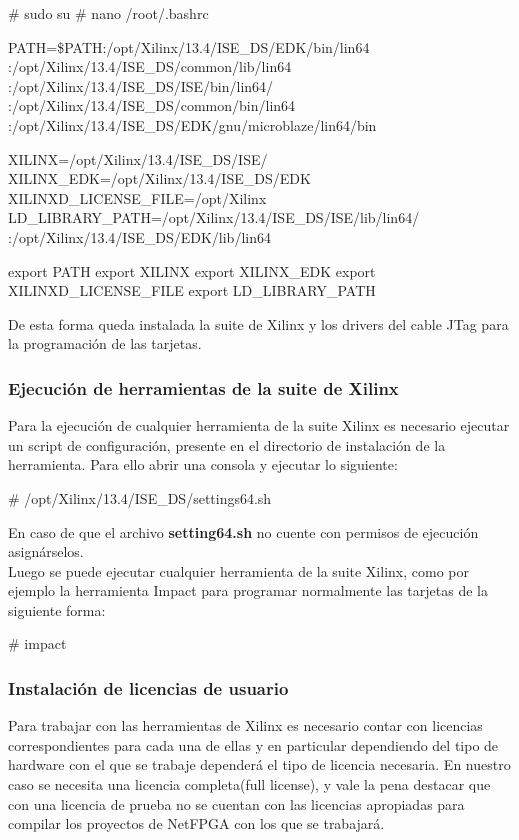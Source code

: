 \begin{bash}
# sudo su
# nano /root/.bashrc

PATH=\$PATH:/opt/Xilinx/13.4/ISE_DS/EDK/bin/lin64
:/opt/Xilinx/13.4/ISE_DS/common/lib/lin64
:/opt/Xilinx/13.4/ISE_DS/ISE/bin/lin64/
:/opt/Xilinx/13.4/ISE_DS/common/bin/lin64
:/opt/Xilinx/13.4/ISE_DS/EDK/gnu/microblaze/lin64/bin

XILINX=/opt/Xilinx/13.4/ISE_DS/ISE/
XILINX_EDK=/opt/Xilinx/13.4/ISE_DS/EDK
XILINXD_LICENSE_FILE=/opt/Xilinx
LD_LIBRARY_PATH=/opt/Xilinx/13.4/ISE_DS/ISE/lib/lin64/
:/opt/Xilinx/13.4/ISE_DS/EDK/lib/lin64

export PATH
export XILINX
export XILINX_EDK
export XILINXD_LICENSE_FILE
export LD_LIBRARY_PATH
\end{bash}

De esta forma queda instalada la suite de Xilinx y los drivers del cable JTag para la programación de las tarjetas.

\subsubsection{Ejecución de herramientas de la suite de Xilinx}
Para la ejecución de cualquier herramienta de la suite Xilinx es necesario ejecutar un script de configuración, presente en el directorio de instalación de la herramienta. Para ello abrir una consola y ejecutar lo siguiente:\\

\begin{bash}
# /opt/Xilinx/13.4/ISE_DS/settings64.sh
\end{bash}

En caso de que el archivo \textbf{setting64.sh} no cuente con permisos de ejecución asignárselos.\\ 

Luego se puede ejecutar cualquier herramienta de la suite Xilinx, como por ejemplo la herramienta Impact para programar normalmente las tarjetas de la siguiente forma:\\

\begin{bash}
# impact
\end{bash}

\subsubsection{Instalación de licencias de usuario}
Para trabajar con las herramientas de Xilinx es necesario contar con licencias correspondientes para cada una de ellas y en particular dependiendo del tipo de hardware con el que se trabaje dependerá el tipo de licencia necesaria. En nuestro caso se necesita una licencia completa(full license), y vale la pena destacar que con una licencia de prueba no se cuentan con las licencias apropiadas para compilar los proyectos de NetFPGA con los que se trabajar\'a.\\


